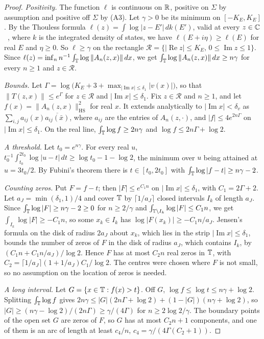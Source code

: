 \begin{proof}
\emph{Positivity.} The function $\ell$ is continuous on $\mathbb R$, positive on $\Sigma$ by assumption and positive off $\Sigma$ by (A3). Let $\gamma>0$ be its minimum on $[-K_E,K_E]$. By the Thouless formula $\ell(z)=\int\log|z-E'|\,dk(E')$, valid at every $z\in\mathbb C$~\cite{CraigSimon1983}, where $k$ is the integrated density of states, we have $\ell(E+i\eta)\ge\ell(E)$ for real $E$ and $\eta\ge0$. So $\ell\ge\gamma$ on the rectangle $\mathcal R=\{|\operatorname{Re}z|\le K_E,\,0\le\operatorname{Im}z\le1\}$. Since $\ell(z)=\inf_nn^{-1}\int_\mathbb T\log\|A_n(z,x)\|\,dx$, we get $\int_\mathbb T\log\|A_n(z,x)\|\,dx\ge n\gamma$ for every $n\ge1$ and $z\in\mathcal R$.

\emph{Bounds.} Let $\Gamma=\log\bigl(K_E+3+\max_{|\operatorname{Im}x|\le\delta_1}|v(x)|\bigr)$, so that $\|T(z,x)\|\le e^\Gamma$ for $z\in\mathcal R$ and $|\operatorname{Im}x|\le\delta_1$. Fix $z\in\mathcal R$ and $n\ge1$, and let $f(x)=\|A_n(z,x)\|_{\mathrm{HS}}^2$ for real $x$. It extends analytically to $|\operatorname{Im}x|<\delta_v$ as $\sum_{i,j}a_{ij}(x)\overline{a_{ij}(\bar x)}$, where $a_{ij}$ are the entries of $A_n(z,\cdot)$, and $|f|\le4e^{2n\Gamma}$ on $|\operatorname{Im}x|\le\delta_1$. On the real line, $\int_\mathbb T\log f\ge2n\gamma$ and $\log f\le2n\Gamma+\log2$.

\emph{A threshold.} Let $t_0=e^{n\gamma}$. For every real $u$, $t_0^{-1}\int_{t_0}^{2t_0}\log|u-t|\,dt\ge\log t_0-1-\log2$, the minimum over $u$ being attained at $u=3t_0/2$. By Fubini's theorem there is $t\in[t_0,2t_0]$ with $\int_\mathbb T\log|f-t|\ge n\gamma-2$.

\emph{Counting zeros.} Put $F=f-t$; then $|F|\le e^{C_1n}$ on $|\operatorname{Im}x|\le\delta_1$, with $C_1=2\Gamma+2$. Let $a_J=\min(\delta_1,1)/4$ and cover $\mathbb T$ by $\lceil1/a_J\rceil$ closed intervals $I_k$ of length $a_J$. Since $\int_\mathbb T\log|F|\ge n\gamma-2\ge0$ for $n\ge2/\gamma$ and $\int_{\mathbb T\setminus I_k}\log|F|\le C_1n$, we get $\int_{I_k}\log|F|\ge-C_1n$, so some $x_k\in I_k$ has $\log|F(x_k)|\ge-C_1n/a_J$. Jensen's formula on the disk of radius $2a_J$ about $x_k$, which lies in the strip $|\operatorname{Im}x|\le\delta_1$, bounds the number of zeros of $F$ in the disk of radius $a_J$, which contains $I_k$, by $(C_1n+C_1n/a_J)/\log2$. Hence $F$ has at most $C_2n$ real zeros in $\mathbb T$, with $C_2=\lceil1/a_J\rceil(1+1/a_J)C_1/\log2$. The centres were chosen where $F$ is not small, so no assumption on the location of zeros is needed.

\emph{A long interval.} Let $G=\{x\in\mathbb T:f(x)>t\}$. Off $G$, $\log f\le\log t\le n\gamma+\log2$. Splitting $\int_\mathbb T\log f$ gives $2n\gamma\le|G|(2n\Gamma+\log2)+(1-|G|)(n\gamma+\log2)$, so $|G|\ge(n\gamma-\log2)/(2n\Gamma)\ge\gamma/(4\Gamma)$ for $n\ge2\log2/\gamma$. The boundary points of the open set $G$ are zeros of $F$, so $G$ has at most $C_2n+1$ components, and one of them is an arc of length at least $c_4/n$, $c_4=\gamma/(4\Gamma(C_2+1))$.


\end{proof}

